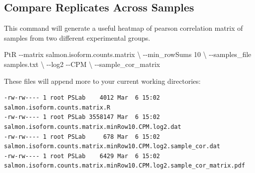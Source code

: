 \documentclass[
  letterpaper,
  DIV=11,
  numbers=noendperiod]{scrreprt}
\newenvironment{Shaded}{\begin{snugshade}}{\end{snugshade}}
\newcommand{\AttributeTok}[1]{\textcolor[rgb]{0.40,0.45,0.13}{#1}}
\newcommand{\DataTypeTok}[1]{\textcolor[rgb]{0.68,0.00,0.00}{#1}}
\newcommand{\ExtensionTok}[1]{\textcolor[rgb]{0.00,0.23,0.31}{#1}}
\newcommand{\NormalTok}[1]{\textcolor[rgb]{0.00,0.23,0.31}{#1}}
\begin{document}
\hypertarget{compare-replicates-across-samples}{%
\subsection{Compare Replicates Across
Samples}\label{compare-replicates-across-samples}}

\begin{tcolorbox}[enhanced jigsaw, breakable, bottomrule=.15mm, left=2mm, coltitle=black, opacityback=0, colframe=quarto-callout-note-color-frame, toprule=.15mm, opacitybacktitle=0.6, colbacktitle=quarto-callout-note-color!10!white, bottomtitle=1mm, colback=white, toptitle=1mm, titlerule=0mm, rightrule=.15mm, arc=.35mm, title=\textcolor{quarto-callout-note-color}{\faInfo}\hspace{0.5em}{Activity}, leftrule=.75mm]

This command will generate a useful heatmap of pearson correlation
matrix of samples from two different experimental groups.

\begin{Shaded}
\begin{Highlighting}[]
    \ExtensionTok{PtR} \AttributeTok{{-}{-}matrix}\NormalTok{ salmon.isoform.counts.matrix }\DataTypeTok{\textbackslash{}}
    \AttributeTok{{-}{-}min\_rowSums}\NormalTok{ 10 }\DataTypeTok{\textbackslash{}}
    \AttributeTok{{-}{-}samples\_file}\NormalTok{ samples.txt }\DataTypeTok{\textbackslash{}}
    \AttributeTok{{-}{-}log2} \AttributeTok{{-}{-}CPM} \DataTypeTok{\textbackslash{}}
    \AttributeTok{{-}{-}sample\_cor\_matrix}
\end{Highlighting}
\end{Shaded}

\end{tcolorbox}

These files will append more to your current working directories:

\begin{verbatim}
-rw-rw---- 1 root PSLab    4012 Mar  6 15:02 salmon.isoform.counts.matrix.R
-rw-rw---- 1 root PSLab 3558147 Mar  6 15:02 salmon.isoform.counts.matrix.minRow10.CPM.log2.dat
-rw-rw---- 1 root PSLab     678 Mar  6 15:02 salmon.isoform.counts.matrix.minRow10.CPM.log2.sample_cor.dat
-rw-rw---- 1 root PSLab    6429 Mar  6 15:02 salmon.isoform.counts.matrix.minRow10.CPM.log2.sample_cor_matrix.pdf
\end{verbatim}
\end{document}
